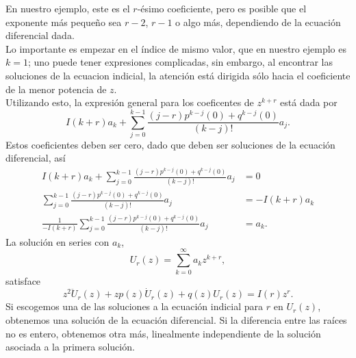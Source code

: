 \documentclass[main.tex]{subfiles}
\begin{document}
En nuestro ejemplo, este es el $r$-ésimo coeficiente, pero es posible que el exponente más pequeño sea $r-2$, $r-1$ o algo más, dependiendo de la ecuación diferencial dada.\\
\indent Lo importante es empezar en el índice de mismo valor, que en nuestro ejemplo es $k=1$; uno puede tener expresiones complicadas, sin embargo, al encontrar las soluciones de la ecuacion indicial, la atención está dirigida sólo hacia el coeficiente de la menor potencia de $z$.\\
\indent Utilizando esto, la expresión general para los coeficentes de $z^{k+r}$ está dada por
\[
  I(k+r)a_{k}+\sum_{j=0}^{k-1}\frac{(j-r)p^{k-j}(0)+q^{k-j}(0)}{(k-j)!}a_{j}.
\]
\indent Estos coeficientes deben ser cero, dado que deben ser soluciones de la ecuación diferencial, así
\begin{align*}
  I(k+r)a_{k}+\sum_{j=0}^{k-1}\frac{(j-r)p^{k-j}(0)+q^{k-j}(0)}{(k-j)!}a_{j}&=0\\
  \sum_{j=0}^{k-1}\frac{(j-r)p^{k-j}(0)+q^{k-j}(0)}{(k-j)!}a_{j}&=-I(k+r)a_{k}\\
  \frac{1}{-I(k+r)}\sum_{j=0}^{k-1}\frac{(j-r)p^{k-j}(0)+q^{k-j}(0)}{(k-j)!}a_{j}&=a_{k}.
\end{align*}
\indent La solución en series con $a_{k}$,
\[
  U_{r}(z)=\sum_{k=0}^{\infty}a_{k}z^{k+r},
\]
satisface
\[
  z^{2}\ddot{U}_{r}(z)+zp(z)\dot{U}_{r}(z)+q(z)U_{r}(z)=I(r)z^{r}.
\]
\indent Si escogemos una de las soluciones a la ecuación indicial para $r$ en $U_{r}(z)$, obtenemos una solución de la ecuación diferencial. Si la diferencia entre las raíces no es entero, obtenemos otra más, linealmente independiente de la solución asociada a la primera solución.\\
\end{document}
